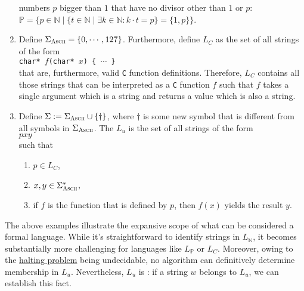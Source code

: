 \begin{enumerate}
      numbers $p$ bigger than $1$ that have no divisor other than $1$ or $p$:
      \\[0.2cm]
      \hspace*{1.3cm}
      $\mathbb{P} = \bigl\{ p \in \mathbb{N} \;\big|\; \{ t \in \mathbb{N} \mid \exists k \in
      \mathbb{N} : k \cdot t = p \} = \{1, p\} \bigr\}$.
\item Define $\Sigma_{\textsc{\scriptsize Ascii}} = \{ 0, \cdots, 127\}$.  Furthermore, define $L_C$
      as the set of all strings of the form
      \\[0.2cm]
      \hspace*{1.3cm}
      \texttt{char* $f$(char* $x$) \{ $\cdots$ \}}
      \\[0.2cm]
      that are, furthermore, valid \texttt{C} function definitions.
      Therefore,  $L_C$ contains all those strings that can be interpreted as a \texttt{C} function $f$
      such that $f$ takes a single argument which is a string and returns a value which is also a
      string.
\item Define $\Sigma := \Sigma_{\textsc{\scriptsize Ascii}} \cup \{\dag\}$, where
      $\mathtt{\dag}$ is some new symbol that is different from all symbols in
      $\Sigma_{\textsc{\scriptsize Ascii}}$.
      The   $L_u$ is the set of all strings of the form
      \\[0.2cm]
      \hspace*{1.3cm}
      $p$\dag$x$\dag$y$
      \\[0.2cm]
      such that
      \begin{enumerate}
      \item $p \in L_C$,
      \item $x,y \in \Sigma_{\textsc{Ascii}}^*$,
      \item if $f$ is the function that is defined by $p$, then $f(x)$ yields the result $y$.
            \eox
      \end{enumerate}
    \end{enumerate}

The above examples illustrate the expansive scope of what can be considered a formal language. While it's
straightforward to identify strings in \( L_\mathbb{N} \), it becomes substantially more challenging for
languages like \( L_\mathbb{P} \) or \( L_C \). Moreover, owing to the
\href{https://en.wikipedia.org/wiki/Halting_problem}{halting problem} being undecidable, no algorithm can
definitively determine membership in \( L_u \). Nevertheless, \( L_u \) is : if a string
\( w \) belongs to \( L_u \), we can establish this fact.  

